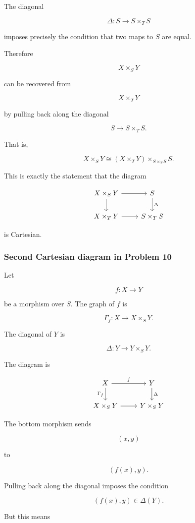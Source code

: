 \documentclass[12pt,a4paper]{article}
\theoremstyle{notespace}
\begin{document}
The diagonal

\[
\Delta:S\to S\times_T S
\]

imposes precisely the condition that two maps to \(S\) are equal.

Therefore

\[
X\times_S Y
\]

can be recovered from

\[
X\times_T Y
\]

by pulling back along the diagonal

\[
S\to S\times_T S.
\]

That is,

\[
X\times_S Y
\cong
(X\times_T Y)\times_{S\times_T S}S.
\]

This is exactly the statement that the diagram

\[
\begin{tikzcd}
	X\times_S Y \arrow[r] \arrow[d]
	&
	S \arrow[d,"\Delta"]
	\\
	X\times_T Y \arrow[r]
	&
	S\times_T S
\end{tikzcd}
\]

is Cartesian.

\subsubsection{Second Cartesian diagram in Problem 10}

Let

\[
f:X\to Y
\]

be a morphism over \(S\). The graph of \(f\) is

\[
\Gamma_f:X\to X\times_S Y.
\]

The diagonal of \(Y\) is

\[
\Delta:Y\to Y\times_S Y.
\]

The diagram is

\[
\begin{tikzcd}
	X \arrow[r,"f"] \arrow[d,"\Gamma_f"']
	&
	Y \arrow[d,"\Delta"]
	\\
	X\times_S Y \arrow[r]
	&
	Y\times_S Y
\end{tikzcd}
\]

The bottom morphism sends

\[
(x,y)
\]

to

\[
(f(x),y).
\]

Pulling back along the diagonal imposes the condition

\[
(f(x),y)\in \Delta(Y).
\]

But this means
\end{document}
